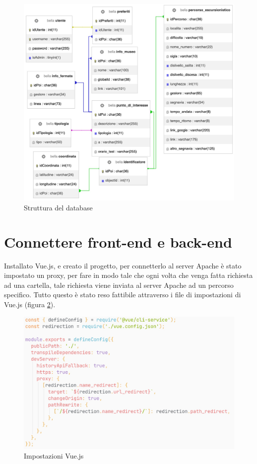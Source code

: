 \begin{figure}[h]
\begin{center}                      
\includegraphics[width=13cm]{images/Database.jpg}
\caption[Struttura del database]{Struttura del database}\label{fig:database}
\end{center}
\end{figure}

\section{Connettere front-end e back-end}
Installato Vue.js, e creato il progetto, per connetterlo al server Apache è stato impostato un proxy, per fare in modo tale che ogni volta che venga fatta richiesta ad una cartella, tale richiesta viene inviata al server Apache ad un percorso specifico. Tutto questo è stato reso fattibile attraverso i file di impostazioni di Vue.js (figura \ref{fig:Webpack}).

\begin{figure}[h]
\begin{center}                      
\includegraphics[width=13cm]{images/Webpack.jpg}
\caption[Impostazione web server]{Impostazioni Vue.js}\label{fig:Webpack}
\end{center}
\end{figure}

